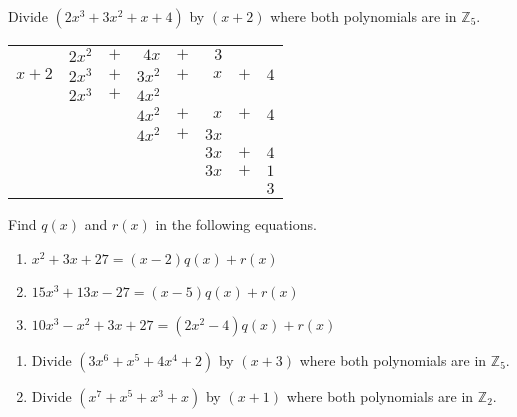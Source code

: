 \begin{example}\label{example:poly:poly_division} 
Divide $(2x^3+3x^2+x+4)$ by $(x+2)$ where  both polynomials are in $\mathbb{Z}_5$.
\begin{center}
\begin{tabular}{rrcrcrcr}
        &  $2x^2$  &  $+$  &      $4x$  &  $+$  &    $3$  &       &       \\ \cline{2-8}
 \multicolumn{1}{r|}{$x + 2$}
        &  $2x^3$  &  $+$  &    $3x^2$  &  $+$  & $ x$  &  $+$  &  $4$  \\
        &  $2x^3$  &  $+$  &    $4 x^2$  &       &         &       &       \\ \cline{2-8}
        &         &       &                $4x^2$  & $+$  &  $ x$  &  $+$  &  $4$  \\
        &         &       &                $4x^2$  &  $+$  & $ 3x$  &       &       \\ \cline{4-8}
        &         &       &           &       &                         $3 x$  & $+$  & $4$  \\
        &         &       &           &       &                          $3x$  & $+$  & $1$  \\ \cline{6-8}
        &         &       &           &       &         &       &                               $3$
\end{tabular}
\end{center}
\end{example}


\begin {exercise}{}
Find $q(x)$ and $r(x)$ in the following equations.
\begin {enumerate} [(1)]
\item $x^2+3x+27=(x-2)q(x) + r(x)$
\item $15x^3+13x-27=(x-5)q(x) + r(x)$
\item $10x^3 - x^2+3x+27=(2x^2-4)q(x) + r(x)$
\end {enumerate}
\end {exercise}

\begin {exercise}{}
\begin {enumerate} [(1)]
\item Divide  $ ( 3x^6 + x^5 +4x^4 +2)$  by $ ( x+3) $ where both polynomials are in  $\mathbb{Z}_5$.
\item Divide $ (x^7 + x^5 + x^3 + x)$  by $ ( x + 1 ) $ where both polynomials are in $ \mathbb{Z}_2$.
\end {enumerate}
\end {exercise}


